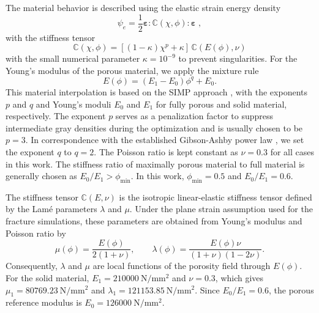 \documentclass[
	pdflatex,
	sn-mathphys-num
]{sn-jnl}
\theoremstyle{thmstyleone}%
\theoremstyle{thmstyletwo}%
\theoremstyle{thmstylethree}%
\begin{document}
The material behavior is described using the elastic strain
energy density
\begin{equation}
	\label{eq:psi}
	\psi_e=\frac{1}{2}\boldsymbol{\varepsilon}
	:\mathbb{C}(\chi,\phi):\boldsymbol{\varepsilon}\;,
\end{equation}
with the stiffness tensor
\begin{equation}
	\label{eq:E_eff}
	\mathbb{C}(\chi,\phi)
	=[(1-\kappa)\chi^p+\kappa]\,
	\mathbb{C}\!\left(E(\phi),\nu\right)
\end{equation}
with the small numerical parameter $\kappa = 10^{-9}$ to prevent
singularities. For the Young's modulus of the porous material,
we apply the mixture rule
\begin{equation}
	E(\phi)=(E_1-E_0)\phi^q+E_0 .
	\label{eq:E_phi}
\end{equation}
This material interpolation is based on the SIMP approach
\cite{bendsoe_optimal_1989}, with the exponents $p$ and $q$ and
Young's moduli $E_0$ and $E_1$ for fully porous and solid
material, respectively. The exponent $p$ serves as a
penalization factor to suppress intermediate gray densities
during the optimization and is usually chosen to be $p=3$.
In correspondence with the established Gibson-Ashby power law
\cite{gibson_mechanics_1982}, we set the exponent $q$ to
$q=2$. The Poisson ratio is kept constant as $\nu=0.3$ for all
cases in this work. The stiffness ratio of maximally porous
material to full material is generally chosen as
$E_0/E_1>\phi_\mathrm{min}$. In this work,
$\phi_\mathrm{min}=0.5$ and $E_0/E_1=0.6$.

The stiffness tensor $\mathbb{C}(E,\nu)$ is the isotropic
linear-elastic stiffness tensor defined by the Lam\'{e}
parameters $\lambda$ and $\mu$. Under the plane strain
assumption used for the fracture simulations, these parameters
are obtained from Young's modulus and Poisson ratio by
\begin{equation}
	\mu(\phi)=\frac{E(\phi)}{2(1+\nu)}, \qquad
	\lambda(\phi)=
	\frac{E(\phi)\nu}{(1+\nu)(1-2\nu)} .
	\label{eq:lame_from_E}
\end{equation}
Consequently, $\lambda$ and $\mu$ are local functions of the
porosity field through $E(\phi)$. For the solid material,
$E_1=210000~\mathrm{N}/\mathrm{mm}^2$ and $\nu=0.3$, which gives
$\mu_1=80769.23~\mathrm{N}/\mathrm{mm}^2$ and
$\lambda_1=121153.85~\mathrm{N}/\mathrm{mm}^2$. Since
$E_0/E_1=0.6$, the porous reference modulus is
$E_0=126000~\mathrm{N}/\mathrm{mm}^2$.
\end{document}

